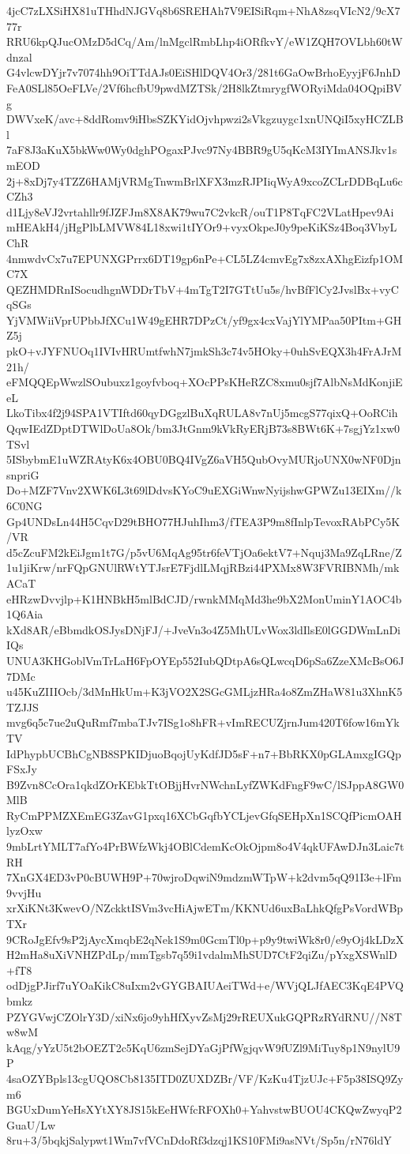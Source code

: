4jcC7zLXSiHX81uTHhdNJGVq8b6SREHAh7V9EISiRqm+NhA8zsqVIcN2/9cX777r
RRU6kpQJucOMzD5dCq/Am/lnMgclRmbLhp4iORfkvY/eW1ZQH7OVLbh60tWdnzal
G4vlcwDYjr7v7074hh9OiTTdAJs0EiSHlDQV4Or3/281t6GaOwBrhoEyyjF6JnhD
FeA0SLl85OeFLVe/2Vf6hcfbU9pwdMZTSk/2H8lkZtmrygfWORyiMda04OQpiBVg
DWVxeK/avc+8ddRomv9iHbsSZKYidOjvhpwzi2sVkgzuygc1xnUNQiI5xyHCZLBl
7aF8J3aKuX5bkWw0Wy0dghPOgaxPJvc97Ny4BBR9gU5qKcM3IYImANSJkv1smEOD
2j+8xDj7y4TZZ6HAMjVRMgTnwmBrlXFX3mzRJPIiqWyA9xcoZCLrDDBqLu6cCZh3
d1Ljy8eVJ2vrtahllr9fJZFJm8X8AK79wu7C2vkcR/ouT1P8TqFC2VLatHpev9Ai
mHEAkH4/jHgPlbLMVW84L18xwi1tIYOr9+vyxOkpeJ0y9peKiKSz4Boq3VbyLChR
4nmwdvCx7u7EPUNXGPrrx6DT19gp6nPe+CL5LZ4cmvEg7x8zxAXhgEizfp1OMC7X
QEZHMDRnISocudhgnWDDrTbV+4mTgT2I7GTtUu5s/hvBfFlCy2JvslBx+vyCqSGs
YjVMWiiVprUPbbJfXCu1W49gEHR7DPzCt/yf9gx4cxVajYlYMPaa50PItm+GHZ5j
pkO+vJYFNUOq1IVIvHRUmtfwhN7jmkSh3c74v5HOky+0uhSvEQX3h4FrAJrM21h/
eFMQQEpWwzlSOubuxz1goyfvboq+XOcPPsKHeRZC8xmu0sjf7AlbNsMdKonjiEeL
LkoTibx4f2j94SPA1VTIftd60qyDGgzlBuXqRULA8v7nUj5mcgS77qixQ+OoRCih
QqwIEdZDptDTWlDoUa8Ok/bm3JtGnm9kVkRyERjB73s8BWt6K+7sgjYz1xw0TSvl
5ISbybmE1uWZRAtyK6x4OBU0BQ4IVgZ6aVH5QubOvyMURjoUNX0wNF0DjnsnpriG
Do+MZF7Vnv2XWK6L3t69lDdvsKYoC9uEXGiWnwNyijshwGPWZu13EIXm//k6C0NG
Gp4UNDsLn44H5CqvD29tBHO77HJuhIhm3/fTEA3P9m8fInlpTevoxRAbPCy5K/VR
d5cZcuFM2kEiJgm1t7G/p5vU6MqAg95tr6feVTjOa6ektV7+Nquj3Ma9ZqLRne/Z
1u1jiKrw/nrFQpGNUlRWtYTJsrE7FjdlLMqjRBzi44PXMx8W3FVRIBNMh/mkACaT
eHRzwDvvjlp+K1HNBkH5mlBdCJD/rwnkMMqMd3he9bX2MonUminY1AOC4b1Q6Aia
kXd8AR/eBbmdkOSJysDNjFJ/+JveVn3o4Z5MhULvWox3ldIlsE0lGGDWmLnDiIQs
UNUA3KHGoblVmTrLaH6FpOYEp552IubQDtpA6sQLwcqD6pSa6ZzeXMcBsO6J7DMc
u45KuZIIIOcb/3dMnHkUm+K3jVO2X2SGcGMLjzHRa4o8ZmZHaW81u3XhnK5TZJJS
mvg6q5c7ue2uQuRmf7mbaTJv7ISg1o8hFR+vImRECUZjrnJum420T6fow16mYkTV
IdPhypbUCBhCgNB8SPKIDjuoBqojUyKdfJD5sF+n7+BbRKX0pGLAmxgIGQpFSxJy
B9Zvn8CcOra1qkdZOrKEbkTtOBjjHvrNWchnLyfZWKdFngF9wC/lSJppA8GW0MlB
RyCmPPMZXEmEG3ZavG1pxq16XCbGqfbYCLjevGfqSEHpXn1SCQfPicmOAHlyzOxw
9mbLrtYMLT7afYo4PrBWfzWkj4OBlCdemKcOkOjpm8o4V4qkUFAwDJn3Laic7tRH
7XnGX4ED3vP0cBUWH9P+70wjroDqwiN9mdzmWTpW+k2dvm5qQ91I3e+lFm9vvjHu
xrXiKNt3KwevO/NZckktISVm3vcHiAjwETm/KKNUd6uxBaLhkQfgPsVordWBpTXr
9CRoJgEfv9sP2jAycXmqbE2qNek1S9m0GcmTl0p+p9y9twiWk8r0/e9yOj4kLDzX
H2mHa8uXiVNHZPdLp/mmTgsb7q59i1vdalmMhSUD7CtF2qiZu/pYxgXSWnlD+fT8
odDjgPJirf7uYOaKikC8uIxm2vGYGBAIUAeiTWd+e/WVjQLJfAEC3KqE4PVQbmkz
PZYGVwjCZOlrY3D/xiNx6jo9yhHfXyvZsMj29rREUXukGQPRzRYdRNU//N8Tw8wM
kAqg/yYzU5t2bOEZT2c5KqU6zmSejDYaGjPfWgjqvW9fUZl9MiTuy8p1N9nylU9P
4saOZYBpls13cgUQO8Cb8135ITD0ZUXDZBr/VF/KzKu4TjzUJc+F5p38ISQ9Zym6
BGUxDumYeHsXYtXY8JS15kEeHWfcRFOXh0+YahvstwBUOU4CKQwZwyqP2GuaU/Lw
8ru+3/5bqkjSalypwt1Wm7vfVCnDdoRf3dzqj1KS10FMi9asNVt/Sp5n/rN76ldY
